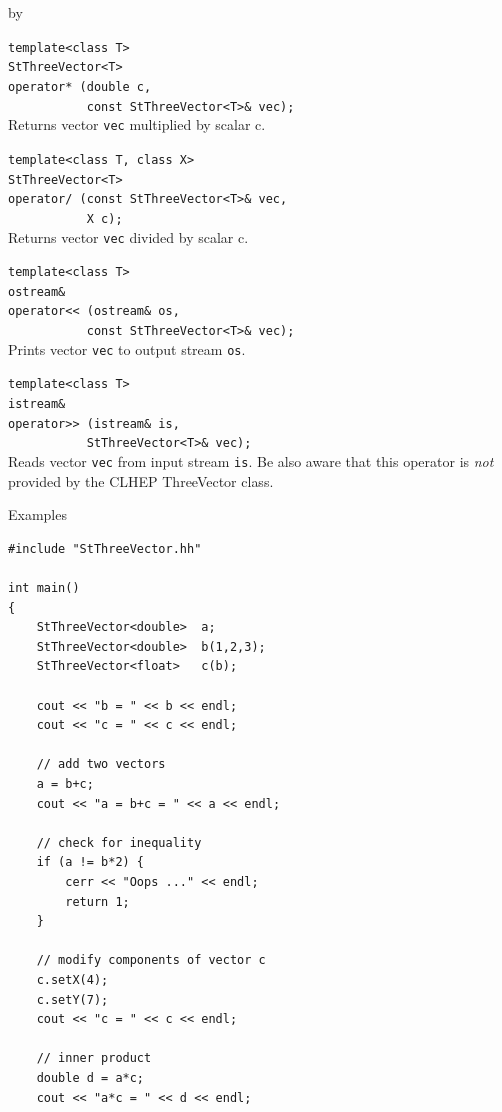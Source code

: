 \documentclass[twoside]{article}
\newcommand{\comp}[1]{\texttt{#1}}%
\newcommand{\entrylabel}[1]{\mbox{\textbf{{#1}}}\hfil}%
\newenvironment{entry}
{\begin{list}{}%
    {\renewcommand{\makelabel}{\entrylabel}%
     \setlength{\labelwidth}{90pt}%
     \setlength{\leftmargin}{\labelwidth}
     \advance\leftmargin by \labelsep%
      }%
    }%
  {\end{list}}
\newcommand{\Entrylabel}[1]%
{\raisebox{0pt}[1ex][0pt]{\makebox[\labelwidth][l]%
    {\parbox[t]{\labelwidth}{\hspace{0pt}\textbf{{#1}}}}}}
\newenvironment{Entry}%
{\renewcommand{\entrylabel}{\Entrylabel}\begin{entry}}%
  {\end{entry}}
\begin{document}
\begin{description}
\begin{Entry}
    \verb+template<class T>+\\
    \verb+StThreeVector<T>+\\
    \verb+operator* (double c,+\\
    \verb+           const StThreeVector<T>& vec);+\\
    Returns vector \comp{vec} multiplied by scalar c.
    
    \verb+template<class T, class X>+\\
    \verb+StThreeVector<T>+\\
    \verb+operator/ (const StThreeVector<T>& vec,+\\
    \verb+           X c);+\\
    Returns vector \comp{vec} divided by scalar c.

    \verb+template<class T>+\\
    \verb+ostream&+\\
    \verb+operator<< (ostream& os,+\\
    \verb+           const StThreeVector<T>& vec);+\\
    Prints vector \comp{vec} to output stream \comp{os}.
    
    \verb+template<class T>+\\
    \verb+istream&+\\
    \verb+operator>> (istream& is,+\\
    \verb+           StThreeVector<T>& vec);+\\
    Reads vector \comp{vec} from input stream \comp{is}.
    Be also aware that this operator is {\em not} provided by
    the CLHEP ThreeVector class.

\item[Examples]
{\footnotesize
\begin{verbatim}
#include "StThreeVector.hh"

int main()
{
    StThreeVector<double>  a;
    StThreeVector<double>  b(1,2,3);
    StThreeVector<float>   c(b);

    cout << "b = " << b << endl;
    cout << "c = " << c << endl;

    // add two vectors
    a = b+c;
    cout << "a = b+c = " << a << endl;

    // check for inequality
    if (a != b*2) {
        cerr << "Oops ..." << endl;
        return 1;
    }

    // modify components of vector c
    c.setX(4);
    c.setY(7);
    cout << "c = " << c << endl;

    // inner product
    double d = a*c;
    cout << "a*c = " << d << endl;


\end{verbatim}}
\end{Entry}
\end{description}
\end{document}
